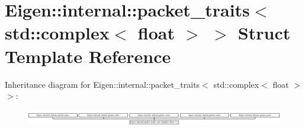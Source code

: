 \hypertarget{struct_eigen_1_1internal_1_1packet__traits_3_01std_1_1complex_3_01float_01_4_01_4}{}\section{Eigen\+::internal\+::packet\+\_\+traits$<$ std\+::complex$<$ float $>$ $>$ Struct Template Reference}
\label{struct_eigen_1_1internal_1_1packet__traits_3_01std_1_1complex_3_01float_01_4_01_4}
Inheritance diagram for Eigen\+::internal\+::packet\+\_\+traits$<$ std\+::complex$<$ float $>$ $>$\+:\begin{figure}[H]
\begin{center}
\leavevmode
\includegraphics[height=0.706625cm]{struct_eigen_1_1internal_1_1packet__traits_3_01std_1_1complex_3_01float_01_4_01_4}
\end{center}
\end{figure}
